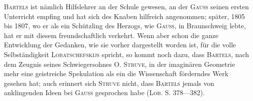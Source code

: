 \textsc{Bartels} ist nämlich Hilfslehrer an der Schule gewesen, an der \textsc{Gauss} seinen
ersten Unterricht empfing und hat sich des Knaben hilfreich angenommen;
später, 1805 bis 1807, wo er als ein Schützling des Herzogs, wie \textsc{Gauss}, in
Braunschweig lebte, hat er mit diesem freundschaftlich verkehrt. Wenn aber
schon die ganze Entwicklung der Gedanken, wie sie vorher dargestellt worden
ist, für die volle Selbständigkeit \textsc{Lobatschefskijs} spricht, so kommt noch dazu,
dass \textsc{Bartels}, nach dem Zeugnis seines Schwiegersohnes O. \textsc{Struve}, in der
imaginären Geometrie mehr eine geistreiche Spekulation als ein die Wissenschaft
förderndes Werk gesehen hat; auch erinnert sich \textsc{Struve} nicht, dass
\textsc{Bartels} jemals von anklingenden Ideen bei \textsc{Gauss} gesprochen habe (\textsc{Lob.}
S. 378—382).
\clearpage\endgroup
